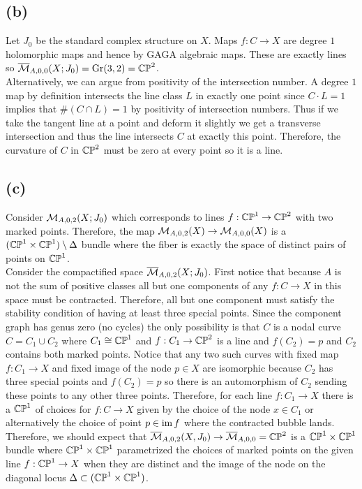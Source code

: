 \documentclass[12pt]{article}
\begin{document}
\subsection{(b)}

Let $J_0$ be the standard complex structure on $X$. Maps $f : C \to X$ are degree $1$ holomorphic maps and hence by GAGA algebraic maps. These are exactly lines so $\overline{\mathcal{M}}_{A,0,0}(X; J_0) = \mathrm{Gr}(3,2) = \mathbb{CP}^2$. 
\bigskip\\
Alternatively, we can argue from positivity of the intersection number. A degree $1$ map by definition intersects the line class $L$ in exactly one point since $C \cdot L = 1$ implies that $\# (C \cap L) = 1$ by positivity of intersection numbers. Thus if we take the tangent line at a point and deform it slightly we get a transverse intersection and thus the line intersects $C$ at exactly this point. Therefore, the curvature of $C$ in $\mathbb{CP}^2$ must be zero at every point so it is a line.

\subsection{(c)}

Consider $\mathcal{M}_{A,0,2}(X; J_0)$ which corresponds to lines $f : \mathbb{CP}^1 \to \mathbb{CP}^2$ with two marked points. Therefore, the map $\mathcal{M}_{A,0,2}(X) \to \mathcal{M}_{A,0,0}(X)$ is a $(\mathbb{CP}^1 \times \mathbb{CP}^1) \setminus \Delta$ bundle where the fiber is exactly the space of distinct pairs of points on $\mathbb{CP}^1$. 
\bigskip\\
Consider the compactified space $\overline{\mathcal{M}}_{A,0,2}(X; J_0)$. First notice that because $A$ is not the sum of positive classes all but one components of any $f : C \to X$ in this space must be contracted. Therefore, all but one component must satisfy the stability condition of having at least three special points. Since the component graph has genus zero (no cycles) the only possibility is that $C$ is a nodal curve $C = C_1 \cup C_2$ where $C_1 \cong \mathbb{CP}^1$ and $f : C_1 \to \mathbb{CP}^2$ is a line and $f(C_2) = p$ and $C_2$ contains both marked points. Notice that any two such curves with fixed map $f : C_1 \to X$ and fixed image of the node $p \in X$ are isomorphic because $C_2$ has three special points and $f(C_2) = p$ so there is an automorphism of $C_2$ sending these points to any other three points. Therefore, for each line $f : C_1 \to X$ there is a $\mathbb{CP}^1$ of choices for $f : C \to X$ given by the choice of the node $x \in C_1$ or alternatively the choice of point $p \in \operatorname{\mathrm{im}}{f}$ where the contracted bubble lands. 
\bigskip\\
Therefore, we should expect that $\overline{\mathcal{M}}_{A,0,2}(X,J_0) \to \overline{\mathcal{M}}_{A,0,0} = \mathbb{CP}^2$ is a $\mathbb{CP}^1 \times \mathbb{CP}^1$ bundle where $\mathbb{CP}^1 \times \mathbb{CP}^1$ parametrized the choices of marked points on the given line $f : \mathbb{CP}^1 \to X$ when they are distinct and the image of the node on the diagonal locus $\Delta \subset (\mathbb{CP}^1 \times \mathbb{CP}^1)$.
\end{document}

